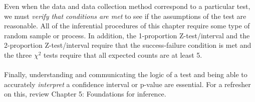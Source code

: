 Even when the data and data collection method correspond to a particular test, we must \emph{verify that conditions are met} to see if the assumptions of the test are reasonable.  All of the inferential procedures of this chapter require some type of random sample or process.  In addition, the 1-proportion Z-test/interval and the 2-proportion Z-test/interval require that the success-failure condition is met and the three $\chi^2$ tests require that all expected counts are at least 5.
\\
\\
Finally, understanding and communicating the logic of a test and being able to accurately \emph{interpret} a confidence interval or p-value are essential.  For a refresher on this, review Chapter 5: Foundations for inference.